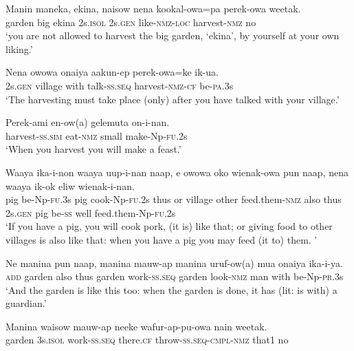 \ea
\gll  Manin  maneka,  ekina,  naisow  nena  kookal-owa=pa  perek-owa{\upshape\footnotemark}   weetak. \\
garden  big  ekina  2s.\textsc{isol}  2s.\textsc{gen}  like-\textsc{nmz}-\textsc{loc}  harvest-\textsc{nmz}  no \\
\glt ‘you are not allowed to harvest the big garden, ‘ekina’, by yourself at  your own liking.’ \\
\z

\ea
\gll  Nena  owowa  onaiya  aakun-ep  perek-owa=ke  ik-ua. \\
2s.\textsc{gen}  village  with  talk-\textsc{ss.seq}  harvest-\textsc{nmz}-\textsc{cf}  be-\textsc{pa}.3s \\
\glt ‘The harvesting must take place (only) after you have talked with your village.’ \\
\z


\ea
\gll  Perek-ami  en-ow(a)  gelemuta  on-i-nan. \\
harvest-\textsc{ss}.\textsc{sim}  eat-\textsc{nmz}  small  make-Np-\textsc{fu}.2s \\
\glt ‘When you harvest you will make a feast.’ \\
\z


\ea
\gll  Waaya  ika-i-non  waaya  uup-i-nan  naap,  e  owowa  oko   wienak-owa  pun  naap,  nena  waaya  ik-ok  eliw  wienak-i-nan. \\
pig  be-Np-\textsc{fu}.3s  pig  cook-Np-\textsc{fu}.2s  thus  or  village  other   feed.them-\textsc{nmz}  also  thus  2s.\textsc{gen}  pig  be-\textsc{ss}  well  feed.them-Np-\textsc{fu}.2s \\


\glt ‘If you have a pig, you will cook pork, (it is) like that; or giving food to other villages is also like that: when you have a pig you may feed (it to) them. ’ \\
\z


\ea
\gll  Ne  manina  pun  naap,  manina  mauw-ap  manina  uruf-ow(a)  mua onaiya  ika-i-ya. \\
\textsc{add}  garden  also  thus  garden  work-\textsc{ss.seq}  garden  look-\textsc{nmz}  man    with  be-Np-\textsc{pr}.3s \\


\glt ‘And the garden is like this too: when the garden is done, it has (lit: is with) a guardian.’ \\
\z


\ea
\gll  Manina  waisow  mauw-ap  neeke  wafur-ap-pu-owa          nain  weetak. \\
garden  3s.\textsc{isol}  work-\textsc{ss.seq}  there.\textsc{cf}  throw-\textsc{ss.seq}-\textsc{cmpl}-\textsc{nmz}  that1  no \\


